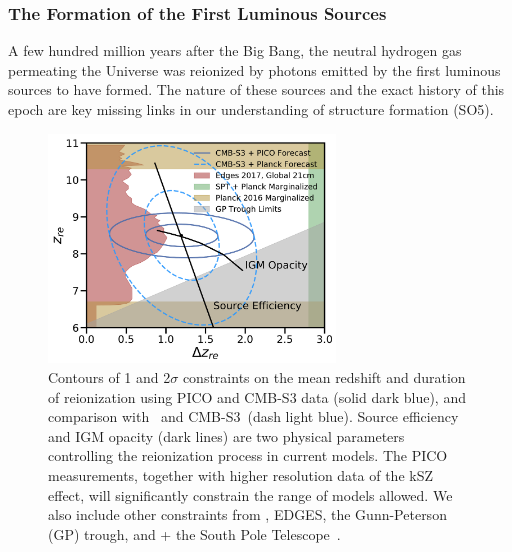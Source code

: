 \documentclass[PICOReport.tex]{subfiles}
\begin{document}
\subsubsection{The Formation of the First Luminous Sources} 
\label{luminoussources}  
A few hundred million years after the Big Bang, the neutral hydrogen gas permeating the Universe was reionized by photons emitted by the first luminous sources to have formed.  The nature of these sources and the exact history of this epoch are key missing links in our understanding of structure formation (SO5).  
\begin{figure}
\hspace{-0.2in}
\parbox{3.1in}{\centerline {
\includegraphics[width=3.0in]{images/Reionization_Contours_zbar_delz_PICO_NEW.pdf} } }
\hspace{0.in}
\parbox{3.5in}{
\caption{\captiontext 
Contours of 1 and 2$\sigma$ constraints on the mean redshift and duration of reionization using PICO and CMB-S3 data (solid dark blue), and comparison with \planck\ and CMB-S3~(dash light blue). Source efficiency and IGM opacity (dark lines) are two physical parameters controlling the reionization process in current models. The PICO measurements, together with higher resolution data of the kSZ effect, will significantly constrain the range of models allowed. We also include other constraints from \planck , EDGES, the Gunn-Peterson (GP) trough, and \planck + the South Pole Telescope~\citep{Planck2018_VI,EDGES2017,Fan2006,Planck2016_reion}.  
\label{fig:ReionizationPICO}
} }
\vspace{-0.1in}
\end{figure}
\end{document}
